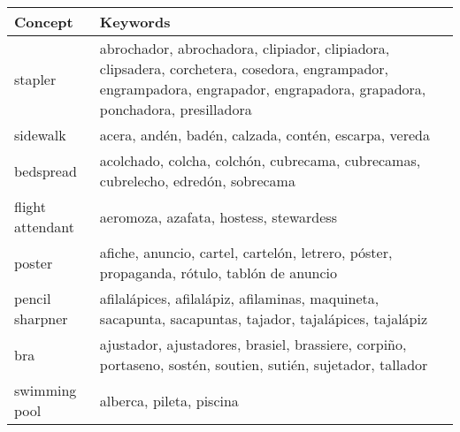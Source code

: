 \documentclass[11pt]{article}
\begin{document}
\begin{table}[H]
\begin{center}
\begin{tabularx}{\linewidth}{l X}
\hline \bf Concept & \bf Keywords \\ \hline
stapler & abrochador, abrochadora, clipiador, clipiadora, clipsadera, corchetera, cosedora, engrampador, engrampadora, engrapador, engrapadora, grapadora, ponchadora, presilladora \\
sidewalk & acera, andén, badén, calzada, contén, escarpa, vereda \\
bedspread & acolchado, colcha, colchón, cubrecama, cubrecamas, cubrelecho, edredón, sobrecama \\
flight attendant & aeromoza, azafata, hostess, stewardess \\
poster & afiche, anuncio, cartel, cartelón, letrero, póster, propaganda, rótulo, tablón de anuncio \\
pencil sharpner & afilalápices, afilalápiz, afilaminas, maquineta, sacapunta, sacapuntas, tajador, tajalápices, tajalápiz \\
bra & ajustador, ajustadores, brasiel, brassiere, corpiño, portaseno, sostén, soutien, sutién, sujetador, tallador \\
swimming pool & alberca, pileta, piscina \\
\hline
\end{tabularx}
\end{center}
\end{table}


\makeatletter
\setlength{\@fptop}{0pt}
\setlength{\@fpbot}{0pt plus 1fil}
\makeatother
\end{document}
